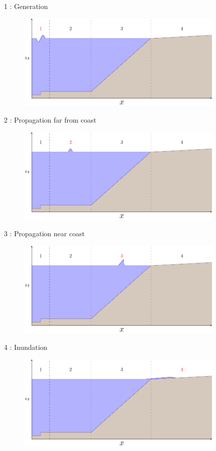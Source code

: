 \documentclass[pdf]{beamer}
\begin{document}
\begin{frame}{{\color{red} 1} : Generation}
	\begin{figure}
		\includegraphics[width=10cm]{./Pics/Tsunami1.pdf}
	\end{figure}
\end{frame}

\begin{frame}{{\color{red} 2} : Propagation far from coast }
	\begin{figure}
		\includegraphics[width=10cm]{./Pics/Tsunami2.pdf}
	\end{figure}
\end{frame}

\begin{frame}{{\color{red} 3} : Propagation near coast }
	\begin{figure}
		\includegraphics[width=10cm]{./Pics/Tsunami3.pdf}
	\end{figure}
\end{frame}

\begin{frame}{{\color{red} 4} : Inundation }
	\begin{figure}
		\includegraphics[width=10cm]{./Pics/Tsunami4.pdf}
	\end{figure}
\end{frame}
\end{document}

